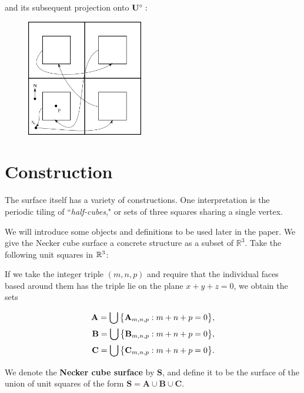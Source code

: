 \documentclass[]{article}
\begin{document}
\noindent and its subsequent projection onto $\mathbf{U}^\circ:$

\begin{figure}[H]
\centering
\includegraphics[width=2in]{overlay.png}
\end{figure}

\section{Construction}

The surface itself has a variety of constructions. One interpretation is the periodic tiling of ``\emph{half-cubes}," or sets of three squares sharing a single vertex.

We will introduce some objects and definitions to be used later in the paper. We give the Necker cube surface a concrete structure as a subset of $\mathbb{R}^3$. Take the following unit squares in $\mathbb{R}^3$:



\noindent If we take the integer triple $(m,n,p)$ and require that the individual faces based around them  has the triple lie on the plane $x+y+z=0$, we obtain the sets 

\begin{align*}
\mathbf{A}=\bigcup\big{\{}\mathbf{A}_{m,n,p}: m+n+p=0\big{\}},
\\\mathbf{B}=\bigcup\big{\{}\mathbf{B}_{m,n,p}: m+n+p=0\big{\}},
\\\mathbf{C}=\bigcup\big{\{}\mathbf{C}_{m,n,p}: m+n+p=0\big{\}}.
\end{align*}


\begin{Def} We denote the \textbf{Necker cube surface} by $\mathbf{S}$, and define it to be the surface of the union of unit squares of the form $\mathbf{S} = \mathbf{A}\cup\mathbf{B}\cup\mathbf{C}$.\end{Def}



\end{document}

